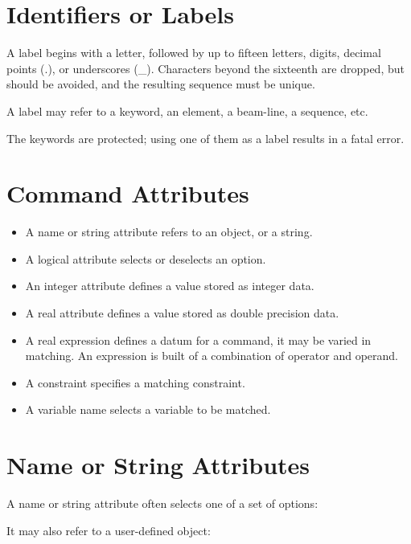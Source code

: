 \section{Identifiers or Labels}
\label{sec:label}
A label begins with a letter, followed by up to fifteen letters, digits,
decimal points (.), or underscores (\_). Characters beyond the sixteenth
are dropped, but should be avoided, and the resulting sequence must be
unique. 

A label may refer to a keyword, an element, a beam-line, a sequence,
etc.   

The \madx keywords are protected; using one of them as a label
results in a fatal error.  


%
\section{Command Attributes}
\label{sec:attribute}

\begin{itemize}
  \item A name or string attribute refers to an object, or a string. 
  \item A logical attribute selects or deselects an option. 
  \item An integer attribute defines a value stored as integer data.
  \item A real attribute defines a value stored as double precision data.  
  \item A real expression defines a datum for a command, it may be
    varied in matching. An expression is built of a combination of
    operator and operand. 
  \item A constraint specifies a matching constraint. 
  \item A variable name selects a variable to be matched. 
\end{itemize}


%
\section{Name or String Attributes}
\label{sec:name}\label{sec:string}
A name or string attribute often selects one of a set of options: 

It may also refer to a user-defined object: 

